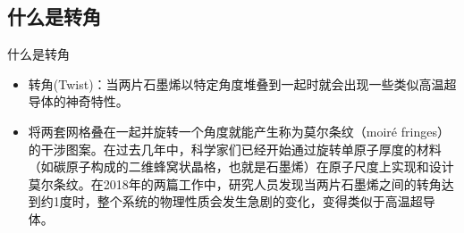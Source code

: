 \documentclass{beamer}
\begin{document}
\subsection{什么是转角}

\begin{frame}{什么是转角}
    \begin{itemize}
        \item 转角(Twist)：当两片石墨烯以特定角度堆叠到一起时就会出现一些类似高温超导体的神奇特性。
        \item 将两套网格叠在一起并旋转一个角度就能产生称为莫尔条纹（moiré fringes）的干涉图案。在过去几年中，科学家们已经开始通过旋转单原子厚度的材料（如碳原子构成的二维蜂窝状晶格，也就是石墨烯）在原子尺度上实现和设计莫尔条纹。在2018年的两篇工作中，研究人员发现当两片石墨烯之间的转角达到约1度时，整个系统的物理性质会发生急剧的变化，变得类似于高温超导体。
    \end{itemize}
\end{frame}
\end{document}
